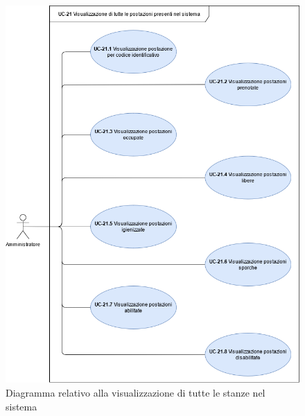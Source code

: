 \begin{figure}[H]
    \centering
      \includegraphics[scale=0.50]{src/CasiDUso/immagini/VisualizzazionePostazioni.png}
    \caption{Diagramma relativo alla visualizzazione di tutte le stanze nel sistema}
\end{figure}

